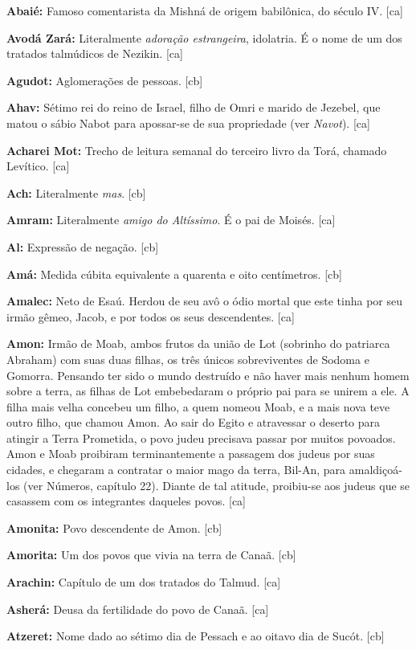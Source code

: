 \textbf{Abaié:} Famoso comentarista da Mishná de origem babilônica, do
século IV. [ca]

\textbf{Avodá Zará:} Literalmente \emph{adoração estrangeira}, idolatria. 
É o nome de um dos tratados talmúdicos de Nezikin. [ca]

\textbf{Agudot:} Aglomerações de pessoas. [cb]

\textbf{Ahav:} Sétimo rei do reino de Israel, filho de Omri e marido de Jezebel, que matou o sábio Nabot para apossar-se de sua propriedade (ver \emph{Navot}). [ca]

\textbf{Acharei Mot:} Trecho de leitura semanal do terceiro livro da Torá, chamado Levítico. [ca]

\textbf{Ach:} Literalmente \emph{mas}. [cb]

\textbf{Amram:} Literalmente \emph{amigo do Altíssimo}. É o pai de Moisés. [ca]

\textbf{Al:} Expressão de negação. [cb]

\textbf{Amá:} Medida cúbita equivalente a quarenta e oito centímetros. [cb]

\textbf{Amalec:} Neto de Esaú. Herdou de seu avô o ódio mortal que
este tinha por seu irmão gêmeo, Jacob, e por todos os seus
descendentes. [ca]

\textbf{Amon:} Irmão de Moab, ambos frutos da união de Lot (sobrinho do
patriarca Abraham) com suas duas filhas, os três únicos sobreviventes
de Sodoma e Gomorra. Pensando ter sido o mundo destruído e não haver
mais nenhum homem sobre a terra, as filhas de Lot embebedaram o próprio
pai para se unirem a ele. A filha mais velha concebeu um
filho, a quem nomeou Moab, e a mais nova teve outro filho, que
chamou Amon. Ao sair do Egito e atravessar o deserto para atingir a
Terra Prometida, o povo judeu precisava passar por muitos povoados.
Amon e Moab proibiram terminantemente a passagem dos judeus por suas
cidades, e chegaram a contratar o maior mago da terra, Bil-An, para
amaldiçoá-los (ver Números, capítulo 22). Diante de tal
atitude, proibiu-se aos judeus que se casassem com os integrantes
daqueles povos. [ca]

\textbf{Amonita:} Povo descendente de Amon. [cb]

\textbf{Amorita:} Um dos povos que vivia na terra de Canaã. [cb]

\textbf{Arachin:} Capítulo de um dos tratados do Talmud. [ca]

\textbf{Asherá:} Deusa da fertilidade do povo de Canaã. [ca]

\textbf{Atzeret:} Nome dado ao sétimo dia de Pessach e ao
oitavo dia de Sucót. [cb]


